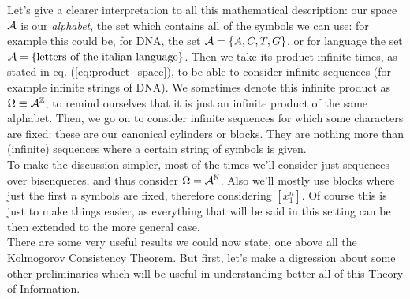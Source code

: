 Let's give a clearer interpretation to all this mathematical description: our space $\mathcal{A}$ is our \textit{alphabet}, the set which contains all of the symbols we can use: for example this could be, for DNA, the set $\mathcal{A}= \{ A,C,T,G \}$, or for language the set $\mathcal{A} = \{ \text{letters of the italian language} \}$. Then we take its product infinite times, as stated in eq. (\ref{eq:product_space}), to be able to consider infinite sequences (for example infinite strings of DNA). We sometimes denote this infinite product as $\Omega \equiv \mathcal{A}^{\mathbb{Z}}$, to remind ourselves that it is just an infinite product of the same alphabet. Then, we go on to consider infinite sequences for which some characters are fixed: these are our canonical cylinders or blocks. They are nothing more than (infinite) sequences where a certain string of symbols is given. 
\\To make the discussion simpler, most of the times we'll consider just sequences over bisenqueces, and thus consider $\Omega=\mathcal{A}^{\mathbb{N}}$. Also we'll mostly use blocks where just the first $n$ symbols are fixed, therefore considering $[x_1^n]$. Of course this is just to make things easier, as everything that will be said in this setting can be then extended to the more general case. 
\\There are some very useful results we could now state, one above all the Kolmogorov Consistency Theorem. But first, let's make a digression about some other preliminaries which will be useful in understanding better all of this Theory of Information.

